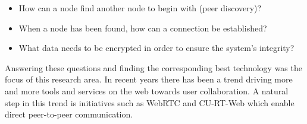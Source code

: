 \begin{itemize}
\item How can a node find another node to begin with (peer discovery)?
\item When a node has been found, how can a connection be established?
\item What data needs to be encrypted in order to ensure the system's integrity?
\end{itemize}

Answering these questions and finding the corresponding best technology was the focus of this research area. In recent years there has been a trend driving more and more tools and services on the web towards user collaboration. A natural step in this trend is initiatives such as WebRTC and CU-RT-Web which enable direct peer-to-peer communication.

